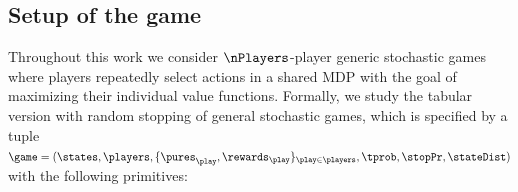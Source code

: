 
\subsection{Setup of the game}
Throughout this work we consider $\nPlayers$-player generic stochastic games where players repeatedly select actions in a shared \ac{MDP} with the goal of maximizing their individual value functions.
Formally, we study the tabular version with random stopping of general stochastic games, which is specified by a tuple $\game = (\states, \players , \braces{\pures_{\play}, \rewards_{\play}}_{\play \in \players} , \tprob, \stopPr,\stateDist)$ with the following primitives:
